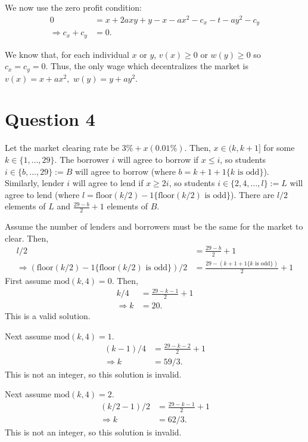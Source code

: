 \documentclass[11pt]{article} %
\begin{document}
We now use the zero profit condition:
\begin{align*}
0 &= x + 2axy + y - x-ax^2 - c_x - t - ay^2 - c_y\\
\Rightarrow c_x + c_y &= 0.
\end{align*}

We know that, for each individual $x$ or $y$, $v(x)\geq0$ or $w(y)\geq0$ so $c_x = c_y = 0.$ Thus, the only wage which decentralizes the market is $v(x) = x + ax^2,$ $w(y) = y + ay^2$.

\section{Question 4}
Let the market clearing rate be  $3\%+x(0.01\%)$. Then, $x\in (k,k+1]$ for some $k \in \{1,\dots,29\}$. The borrower $i$ will agree to borrow if $x\leq i$, so students $i \in \{b, \dots, 29\}:= B$ will agree to borrow (where $b= k +1 + 1\{k \text{ is odd}\}$). Similarly, lender $i$ will agree to lend if $x\geq 2i$, so students $i \in \{2,4,\dots,l\}:= L$ will agree to lend (where $l = \text{floor}(k/2) - 1\{ \text{floor}(k/2) \text{ is odd}\}$). There are $l/2$ elements of $L$ and $\frac{29-b}{2} + 1$ elements of $B$.

Assume the number of lenders and borrowers must be the same for the market to clear. Then,
\begin{align*}
l/2 &= \frac{29-b}{2} + 1\\
\Rightarrow  ( \text{floor}(k/2) - 1\{ \text{floor}(k/2) \text{ is odd}\})/2 &=  \frac{29-(k +1 + 1\{k \text{ is odd}\})}{2} + 1
\end{align*}
First assume $\text{mod}(k,4) = 0.$ Then, 
\begin{align*}
k/4 &= \frac{29 - k - 1}{2}+1\\
\Rightarrow k &= 20.
\end{align*}
This is a valid solution.

Next assume $\text{mod}(k,4) = 1$.
\begin{align*}
(k-1)/4 &= \frac{29 - k - 2}{2} +1\\
\Rightarrow k&= 59/3.
\end{align*}
This is not an integer, so this solution is invalid.

Next assume $\text{mod}(k,4) = 2$.
\begin{align*}
(k/2 - 1)/2 &= \frac{29 - k - 1}{2} +1\\
\Rightarrow k&= 62/3.
\end{align*}
This is not an integer, so this solution is invalid.
\end{document}
